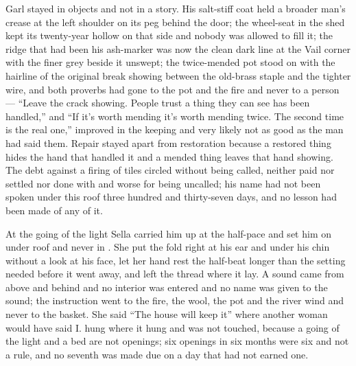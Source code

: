 Garl stayed in objects and not in a story. His salt-stiff coat held a broader man's crease at the left shoulder on its peg behind the door; the wheel-seat in the shed kept its twenty-year hollow on that side and nobody was allowed to fill it; the ridge that had been his ash-marker was now the clean dark line at the Vail corner with the finer grey beside it unswept; the twice-mended pot stood on  with the hairline of the original break showing between the old-brass staple and the tighter wire, and both proverbs had gone to the pot and the fire and never to a person --- “Leave the crack showing. People trust a thing they can see has been handled,” and “If it's worth mending it's worth mending twice. The second time is the real one,” improved in the keeping and very likely not as good as the man had said them. Repair stayed apart from restoration because a restored thing hides the hand that handled it and a mended thing leaves that hand showing. The debt against a firing of tiles circled without being called, neither paid nor settled nor done with and worse for being uncalled; his name had not been spoken under this roof three hundred and thirty-seven days, and no lesson had been made of any of it.

At the going of the light Sella carried him up at the half-pace and set him on  under  roof and never in . She put the fold right at his ear and under his chin without a look at his face, let her hand rest the half-beat longer than the setting needed before it went away, and left the thread where it lay. A sound came from above and behind and no interior was entered and no name was given to the sound; the instruction went to the fire, the wool, the pot and the river wind and never to the basket. She said “The house will keep it” where another woman would have said I.  hung where it hung and was not touched, because a going of the light and a bed are not openings; six openings in six months were six and not a rule, and no seventh was made due on a day that had not earned one.

